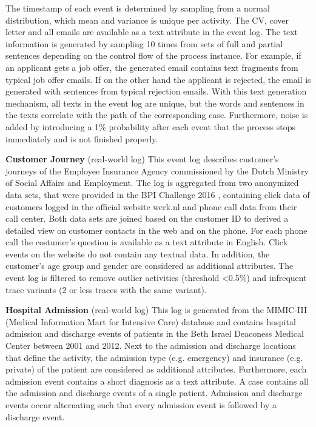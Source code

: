 The timestamp of each event is determined by sampling from a normal distribution, which mean and variance is unique per activity.
The CV, cover letter and all emails are available as a text attribute in the event log.
The text information is generated by sampling 10 times from sets of full and partial sentences depending on the control flow of the process instance.
For example, if an applicant gets a job offer, the generated email contains text fragments from typical job offer emails.
If on the other hand the applicant is rejected, the email is generated with sentences from typical rejection emails.
With this text generation mechanism, all texts in the event log are unique, but the words and sentences in the texts correlate with the path of the corresponding case.
Furthermore, noise is added by introducing a 1\% probability after each event that the process stops immediately and is not finished properly.

\textbf{Customer Journey} (real-world log) This event log describes customer's journeys of the Employee Insurance Agency commissioned by the Dutch Ministry of Social Affairs and Employment.
The log is aggregated from two anonymized data sets, that were provided in the BPI Challenge 2016 \cite{bpichallenge2016}, containing click data of customers logged in the official website werk.nl and phone call data from their call center.
Both data sets are joined based on the customer ID to derived a detailed view on customer contacts in the web and on the phone.
For each phone call the costumer's question is available as a text attribute in English.
Click events on the website do not contain any textual data.
In addition, the customer's age group and gender are considered as additional attributes.
The event log is filtered to remove outlier activities (threshold <0.5\%) and infrequent trace variants (2 or less traces with the same variant).

\textbf{Hospital Admission} (real-world log) This log is generated from the MIMIC-III (Medical Information Mart for Intensive Care) database \cite{johnson2016mimic} and contains hospital admission and discharge events of patients in the Beth Israel Deaconess Medical Center between 2001 and 2012.
Next to the admission and discharge locations that define the activity, the admission type (e.g. emergency) and insurance (e.g. private) of the patient are considered as additional attributes.
Furthermore, each admission event contains a short diagnosis as a text attribute.
A case contains all the admission and discharge events of a single patient.
Admission and discharge events occur alternating such that every admission event is followed by a discharge event.

